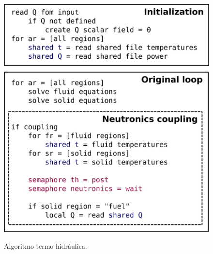 \begin{figure}[htb]
  \caption{Algoritmo termo-hidráulica.}
  \centering\includegraphics[scale=0.5]{figuras/algoritmo_openfoam.png}
  \label{algo_th}
\end{figure}






